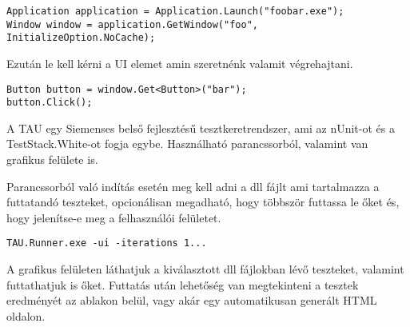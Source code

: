 \begin{verbatim}
Application application = Application.Launch("foobar.exe");
Window window = application.GetWindow("foo", InitializeOption.NoCache);
\end{verbatim}

\noindent Ezután le kell kérni a UI elemet amin szeretnénk valamit végrehajtani.

\begin{verbatim}
Button button = window.Get<Button>("bar");
button.Click();
\end{verbatim}

A TAU egy Siemenses belső fejlesztésű tesztkeretrendszer, ami az nUnit-ot és a\\
TestStack.White-ot fogja egybe. Használható parancssorból, valamint van grafikus felülete is.

\noindent Parancssorból való indítás esetén meg kell adni a dll fájlt ami tartalmazza a futtatandó teszteket, opcionálisan megadható, hogy többször futtassa le őket és, hogy jelenítse-e meg a felhasználói felületet.

\begin{verbatim}
TAU.Runner.exe -ui -iterations 1...
\end{verbatim}

\noindent A grafikus felületen láthatjuk a kiválasztott dll fájlokban lévő teszteket, valamint futtathatjuk is őket. Futtatás után lehetőség van megtekinteni a tesztek eredményét az ablakon belül, vagy akár egy automatikusan generált HTML oldalon.